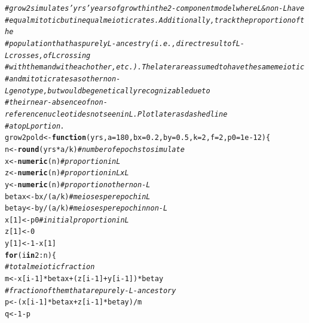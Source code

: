 \documentclass{article}\usepackage[]{graphicx}\usepackage[]{color}
\makeatletter
\newcommand{\hlnum}[1]{\textcolor[rgb]{0.686,0.059,0.569}{#1}}%
\newcommand{\hlcom}[1]{\textcolor[rgb]{0.678,0.584,0.686}{\textit{#1}}}%
\newcommand{\hlopt}[1]{\textcolor[rgb]{0,0,0}{#1}}%
\newcommand{\hlstd}[1]{\textcolor[rgb]{0.345,0.345,0.345}{#1}}%
\newcommand{\hlkwa}[1]{\textcolor[rgb]{0.161,0.373,0.58}{\textbf{#1}}}%
\newcommand{\hlkwb}[1]{\textcolor[rgb]{0.69,0.353,0.396}{#1}}%
\newcommand{\hlkwc}[1]{\textcolor[rgb]{0.333,0.667,0.333}{#1}}%
\newcommand{\hlkwd}[1]{\textcolor[rgb]{0.737,0.353,0.396}{\textbf{#1}}}%
\newenvironment{kframe}{%
 \def\at@end@of@kframe{}%
 \ifinner\ifhmode%
  \def\at@end@of@kframe{\end{minipage}}%
  \begin{minipage}{\columnwidth}%
 \fi\fi%
 \def\FrameCommand##1{\hskip\@totalleftmargin \hskip-\fboxsep
 \colorbox{shadecolor}{##1}\hskip-\fboxsep
     \hskip-\linewidth \hskip-\@totalleftmargin \hskip\columnwidth}%
 \MakeFramed {\advance\hsize-\width
   \@totalleftmargin\z@ \linewidth\hsize
   \@setminipage}}%
 {\par\unskip\endMakeFramed%
 \at@end@of@kframe}
\newenvironment{knitrout}{}{} %
\makeatother
\begin{document}
\begin{knitrout}\footnotesize
{}\color{fgcolor}\begin{kframe}
\begin{alltt}
\hlcom{# grow2 simulates 'yrs' years of growth in the 2-component model where L & non-L have}
\hlcom{# equal mitotic but inequal meiotic rates.  Additionally, track the proportion of the}
\hlcom{# population that has purely L-ancestry (i.e., direct result of L-L crosses, of L crossing}
\hlcom{# with them and with each other, etc.).  The later are assumed to have the same meiotic}
\hlcom{# and mitotic rates as other non-L genotype, but would be genetically recognizable due to}
\hlcom{# their near-absence of non-reference nucleotides not seen in L. Plot later as dashed line}
\hlcom{# atop L portion.}
\hlstd{grow2pold} \hlkwb{<-} \hlkwa{function}\hlstd{(}\hlkwc{yrs}\hlstd{,} \hlkwc{a}\hlstd{=}\hlnum{180}\hlstd{,} \hlkwc{bx}\hlstd{=}\hlnum{0.2}\hlstd{,} \hlkwc{by}\hlstd{=}\hlnum{0.5}\hlstd{,} \hlkwc{k}\hlstd{=}\hlnum{2}\hlstd{,} \hlkwc{f}\hlstd{=}\hlnum{2}\hlstd{,} \hlkwc{p0}\hlstd{=}\hlnum{1e-12}\hlstd{)\{}
  \hlstd{n}  \hlkwb{<-} \hlkwd{round}\hlstd{(yrs}\hlopt{*}\hlstd{a}\hlopt{/}\hlstd{k)} \hlcom{# number of epochs to simulate}
  \hlstd{x}  \hlkwb{<-} \hlkwd{numeric}\hlstd{(n)}     \hlcom{# proportion in L}
  \hlstd{z}  \hlkwb{<-} \hlkwd{numeric}\hlstd{(n)}     \hlcom{# proportion in LxL}
  \hlstd{y}  \hlkwb{<-} \hlkwd{numeric}\hlstd{(n)}     \hlcom{# proportion other non-L}
  \hlstd{betax} \hlkwb{<-} \hlstd{bx}\hlopt{/}\hlstd{(a}\hlopt{/}\hlstd{k)}    \hlcom{# meioses per epoch in L}
  \hlstd{betay} \hlkwb{<-} \hlstd{by}\hlopt{/}\hlstd{(a}\hlopt{/}\hlstd{k)}    \hlcom{# meioses per epoch in non-L}
  \hlstd{x[}\hlnum{1}\hlstd{]}  \hlkwb{<-} \hlstd{p0}          \hlcom{# initial proportion in L}
  \hlstd{z[}\hlnum{1}\hlstd{]}  \hlkwb{<-} \hlnum{0}
  \hlstd{y[}\hlnum{1}\hlstd{]}  \hlkwb{<-} \hlnum{1}\hlopt{-}\hlstd{x[}\hlnum{1}\hlstd{]}
  \hlkwa{for}\hlstd{(i} \hlkwa{in} \hlnum{2}\hlopt{:}\hlstd{n)\{}
    \hlcom{# total meiotic fraction}
    \hlstd{m} \hlkwb{<-} \hlstd{x[i}\hlopt{-}\hlnum{1}\hlstd{]}\hlopt{*}\hlstd{betax} \hlopt{+} \hlstd{(z[i}\hlopt{-}\hlnum{1}\hlstd{]}\hlopt{+}\hlstd{y[i}\hlopt{-}\hlnum{1}\hlstd{])}\hlopt{*}\hlstd{betay}
    \hlcom{# fraction of them that are purely-L-ancestory}
    \hlstd{p} \hlkwb{<-} \hlstd{(x[i}\hlopt{-}\hlnum{1}\hlstd{]}\hlopt{*}\hlstd{betax} \hlopt{+} \hlstd{z[i}\hlopt{-}\hlnum{1}\hlstd{]}\hlopt{*}\hlstd{betay)}\hlopt{/}\hlstd{m}
    \hlstd{q} \hlkwb{<-} \hlnum{1}\hlopt{-}\hlstd{p}

\end{alltt}
\end{kframe}
\end{knitrout}
\end{document}
